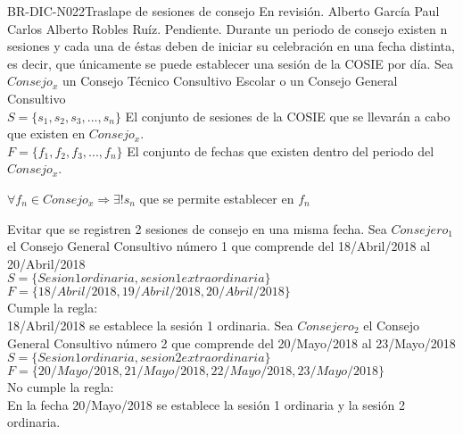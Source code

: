 \begin{BusinessRule}{BR-DIC-N022}{Traslape de sesiones de consejo}
	{\bcCondition}  %
	{\btEnabler}    %
	{\blControlling}    %
	\BRItem[Estado] En revisión.
	 Alberto García Paul
	 Carlos Alberto Robles Ruíz.
	 Pendiente.
	\BRItem[Descripción] Durante un periodo de consejo existen n sesiones y cada una de éstas deben de iniciar su celebración en una fecha distinta, es decir, que únicamente se puede establecer una sesión de la COSIE por día.
	\BRItem[Sentencia] 
	Sea $Consejo_{x}$ un Consejo Técnico Consultivo Escolar o un Consejo  General Consultivo\\
	$S = \{ s_{1}, s_{2}, s_{3}, ... , s_{n} \}$ El conjunto de sesiones de la COSIE que se llevarán a cabo que existen en $Consejo_{x}$.\\
	$F = \{ f_{1}, f_{2}, f_{3}, ... , f_{n} \}$ El conjunto de fechas que existen dentro del periodo del $Consejo_{x}$.\\	
	\begin{center}
		$ \forall f_{n} \in Consejo_{x} \Rightarrow \exists! s_{n}$ que se permite establecer en $f_{n}$ 
	\end{center}
	
	\BRItem[Motivación] Evitar que se registren 2 sesiones de consejo en una misma fecha.
	Sea $Consejero_{1}$ el Consejo General Consultivo número 1 que comprende del 18/Abril/2018 al 20/Abril/2018\\
	$S = \{ Sesion 1 ordinaria, sesion 1 extraordinaria \} $\\
	$F = \{ 18/Abril/2018, 19/Abril/2018, 20/Abril/2018 \} $\\
	Cumple la regla:\\
	18/Abril/2018 se establece la sesión 1 ordinaria.
	Sea $Consejero_{2}$ el Consejo General Consultivo número 2 que comprende del 20/Mayo/2018 al 23/Mayo/2018\\
	$S = \{ Sesion 1 ordinaria, sesion 2 extraordinaria \}$\\
	$F = \{ 20/Mayo/2018, 21/Mayo/2018, 22/Mayo/2018, 23/Mayo/2018 \}$\\
	No cumple la regla:\\
	En la fecha 20/Mayo/2018 se establece la sesión 1 ordinaria y la sesión 2 ordinaria.  
\end{BusinessRule}


